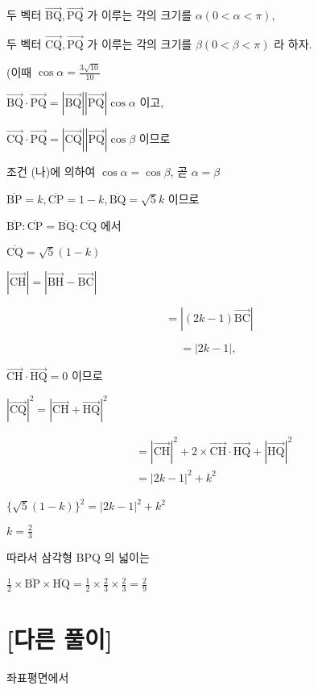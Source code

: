 \documentclass[10pt]{article}
\begin{document}
두 벡터 $\overrightarrow{\mathrm{BQ}}, \overrightarrow{\mathrm{PQ}}$ 가 이루는 각의 크기를 $\alpha(0<\alpha<\pi)$,

두 벡터 $\overrightarrow{\mathrm{CQ}}, \overrightarrow{\mathrm{PQ}}$ 가 이루는 각의 크기를 $\beta(0<\beta<\pi)$ 라 하자.

(이때 $\cos \alpha=\frac{3 \sqrt{10}}{10}$

$\overrightarrow{\mathrm{BQ}} \cdot \overrightarrow{\mathrm{PQ}}=|\overrightarrow{\mathrm{BQ}}||\overrightarrow{\mathrm{PQ}}| \cos \alpha$ 이고,

$\overrightarrow{\mathrm{CQ}} \cdot \overrightarrow{\mathrm{PQ}}=|\overrightarrow{\mathrm{CQ}}||\overrightarrow{\mathrm{PQ}}| \cos \beta$ 이므로

조건 (나)에 의하여 $\cos \alpha=\cos \beta$, 곧 $\alpha=\beta$

$\overline{\mathrm{BP}}=k, \overline{\mathrm{CP}}=1-k, \overline{\mathrm{BQ}}=\sqrt{5} k$ 이므로

$\overline{\mathrm{BP}}: \overline{\mathrm{CP}}=\overline{\mathrm{BQ}}: \overline{\mathrm{CQ}}$ 에서

$\overline{\mathrm{CQ}}=\sqrt{5}(1-k)$

$|\overrightarrow{\mathrm{CH}}|=|\overrightarrow{\mathrm{BH}}-\overrightarrow{\mathrm{BC}}|$

\[
=|(2 k-1) \overrightarrow{\mathrm{BC}}|
\]

\[
=|2 k-1| \text {, }
\]

$\overrightarrow{\mathrm{CH}} \cdot \overrightarrow{\mathrm{HQ}}=0$ 이므로

$|\overrightarrow{\mathrm{CQ}}|^{2}=|\overrightarrow{\mathrm{CH}}+\overrightarrow{\mathrm{HQ}}|^{2}$

\[
\begin{aligned}
& =|\overrightarrow{\mathrm{CH}}|^{2}+2 \times \overrightarrow{\mathrm{CH}} \cdot \overrightarrow{\mathrm{HQ}}+|\overrightarrow{\mathrm{HQ}}|^{2} \\
& =|2 k-1|^{2}+k^{2}
\end{aligned}
\]

$\{\sqrt{5}(1-k)\}^{2}=|2 k-1|^{2}+k^{2}$

$k=\frac{2}{3}$

따라서 삼각형 BPQ 의 넓이는

$\frac{1}{2} \times \overline{\mathrm{BP}} \times \overline{\mathrm{HQ}}=\frac{1}{2} \times \frac{2}{3} \times \frac{2}{3}=\frac{2}{9}$

\section*{[다른 풀이]}
좌표평면에서
\end{document}
